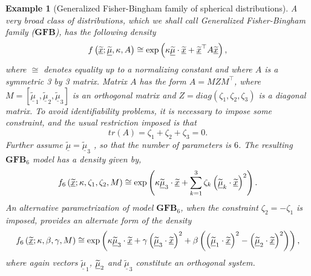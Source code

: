 \documentclass[preprint,11pt,a4paper]{elsarticle}
\newtheorem{example}[theorem]{Example}
\begin{document}
\begin{example}[Generalized Fisher-Bingham family of spherical distributions]

\label{Ex_GFB}A very broad class of distributions, which we shall call
Generalized Fisher-Bingham family ($\mathbf{GFB}$), has the following
density 
\begin{equation*}
f\left( \underline{\widetilde{x}};\underline{\widetilde{\mu}},\kappa
,A\right) \cong\exp\left( \kappa\underline{\widetilde{\mu}}\cdot \underline{%
\widetilde{x}}+\underline{\widetilde{x}}^{\top}A\underline{\widetilde{x}}%
\right) ,
\end{equation*}
where $\cong$ denotes equality up to a normalizing constant and where $A$ is
a symmetric 3 by 3 matrix. Matrix $A$ has the form $A=MZM^{\top}$, where $M=%
\left[ \widetilde{\underline{\mu}}_{1},\widetilde{\underline{\mu}}_{2},%
\widetilde{\underline{\mu}}_{3}\right] $ is an orthogonal matrix and $%
Z=diag\left( \zeta_{1},\zeta_{2},\zeta_{3}\right) $ is a diagonal matrix. To
avoid identifiability problems, it is necessary to impose some constraint,
and the usual restriction imposed is that 
\begin{equation}
tr\left( A\right) =\zeta_{1}+\zeta_{2}+\zeta_{3}=0.  \label{Assumption_zeta}
\end{equation}
Further assume $\widetilde{\underline{\mu}}=\widetilde{\underline{\mu}}_{3}$%
, so that the number of parameters is $6$. The resulting $\mathbf{GFB}_{6}$
model has a density given by, 
\begin{equation}
f_{6}\left( \underline{\widetilde{x}};\kappa,\zeta_{1},\zeta_{2},M\right)
\cong\exp\left( \kappa\widetilde{\underline{\mu}}_{3}\cdot \underline{%
\widetilde{x}}+\sum_{k=1}^{3}\zeta_{k}\left( \widetilde{\underline{\mu}}%
_{k}\cdot\underline{\widetilde{x}}\right) ^{2}\right) .  \label{Density_FB6}
\end{equation}
An alternative parametrization of model $\mathbf{GFB}_{6}$, when the
constraint $\zeta_{2}=-\zeta_{1}$ is imposed, provides an alternate form of
the density 
\begin{equation}
f_{6}\left( \underline{\widetilde{x}};\kappa,\beta,\gamma,M\right)
\cong\exp\left( \kappa\underline{\widetilde{\mu}}_{3}\cdot\underline{%
\widetilde{x}}+\gamma\left( \underline{\widetilde{\mu}}_{3}\cdot\underline{%
\widetilde{x}}\right) ^{2}+\beta\left( \left( \underline{\widetilde{\mu}}%
_{1}\cdot\underline{\widetilde{x}}\right) ^{2}-\left( \underline{\widetilde{%
\mu }}_{2}\cdot\underline{\widetilde{x}}\right) ^{2}\right) \right) ,
\label{FB6_param_G}
\end{equation}
where again vectors $\widetilde{\underline{\mu}}_{1}$, $\widetilde{%
\underline{\mu}}_{2}$ and $\widetilde{\underline{\mu}}_{3}$ constitute an
orthogonal system.
\end{example}
\end{document}
